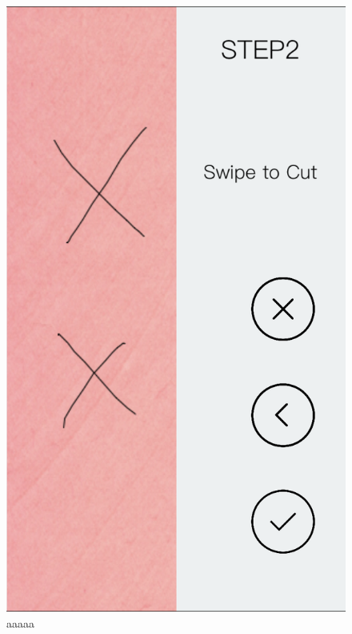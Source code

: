 \documentclass[11pt]{article}
\begin{document}
                \begin{figure}[!ht]
                        \begin{minipage}{0.45\textwidth}
                            \centering \includegraphics[width=0.7\linewidth]{Images/kirieXs.png}
                            \caption{aaaaa\\}
                            \label{fig:kirieXs}
                        \end{minipage}\hfill
                        \begin{minipage}{0.45\textwidth}
                            \centering

\end{minipage}
\end{figure}
\end{document}
